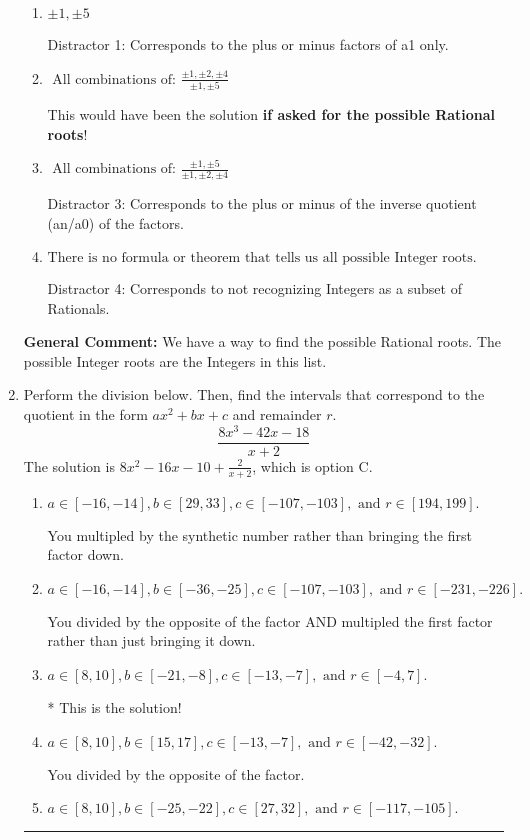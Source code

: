 \documentclass{extbook}[14pt]
\newcommand{\litem}[1]{\item #1

\rule{\textwidth}{0.4pt}}
\begin{document}
\begin{enumerate}
{\begin{enumerate}[label=\Alph*.]
* This is the solution \textbf{since we asked for the possible Integer roots}!
\item \( \pm 1,\pm 5 \)

 Distractor 1: Corresponds to the plus or minus factors of a1 only.
\item \( \text{ All combinations of: }\frac{\pm 1,\pm 2,\pm 4}{\pm 1,\pm 5} \)

This would have been the solution \textbf{if asked for the possible Rational roots}!
\item \( \text{ All combinations of: }\frac{\pm 1,\pm 5}{\pm 1,\pm 2,\pm 4} \)

 Distractor 3: Corresponds to the plus or minus of the inverse quotient (an/a0) of the factors. 
\item \( \text{There is no formula or theorem that tells us all possible Integer roots.} \)

 Distractor 4: Corresponds to not recognizing Integers as a subset of Rationals.
\end{enumerate}

\textbf{General Comment:} We have a way to find the possible Rational roots. The possible Integer roots are the Integers in this list.
}
\litem{
Perform the division below. Then, find the intervals that correspond to the quotient in the form $ax^2+bx+c$ and remainder $r$.
\[ \frac{8x^{3} -42 x -18}{x + 2} \]The solution is \( 8x^{2} -16 x -10 + \frac{2}{x + 2} \), which is option C.\begin{enumerate}[label=\Alph*.]
\item \( a \in [-16, -14], b \in [29, 33], c \in [-107, -103], \text{ and } r \in [194, 199]. \)

 You multipled by the synthetic number rather than bringing the first factor down.
\item \( a \in [-16, -14], b \in [-36, -25], c \in [-107, -103], \text{ and } r \in [-231, -226]. \)

 You divided by the opposite of the factor AND multipled the first factor rather than just bringing it down.
\item \( a \in [8, 10], b \in [-21, -8], c \in [-13, -7], \text{ and } r \in [-4, 7]. \)

* This is the solution!
\item \( a \in [8, 10], b \in [15, 17], c \in [-13, -7], \text{ and } r \in [-42, -32]. \)

 You divided by the opposite of the factor.
\item \( a \in [8, 10], b \in [-25, -22], c \in [27, 32], \text{ and } r \in [-117, -105]. \)


\end{enumerate}}
\end{enumerate}
\end{document}
